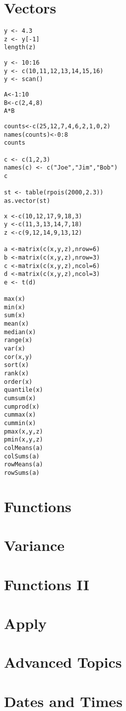 \documentclass{article}
\begin{document}


\section{Vectors}

\begin{verbatim}
y <- 4.3
z <- y[-1]
length(z)
\end{verbatim}

\begin{verbatim}
y <- 10:16
y <- c(10,11,12,13,14,15,16)
y <- scan()
\end{verbatim}

\begin{verbatim}
A<-1:10
B<-c(2,4,8)
A*B
\end{verbatim}

\begin{verbatim}
counts<-c(25,12,7,4,6,2,1,0,2)
names(counts)<-0:8
counts

c <- c(1,2,3)
names(c) <- c("Joe","Jim","Bob")
c

st <- table(rpois(2000,2.3))
as.vector(st)
\end{verbatim}

\begin{verbatim}
x <-c(10,12,17,9,18,3)
y <-c(11,3,13,14,7,18)
z <-c(9,12,14,9,13,12)

a <-matrix(c(x,y,z),nrow=6)
b <-matrix(c(x,y,z),nrow=3)
c <-matrix(c(x,y,z),ncol=6)
d <-matrix(c(x,y,z),ncol=3)
e <- t(d)

max(x)
min(x)
sum(x)
mean(x)
median(x)
range(x)
var(x)
cor(x,y)
sort(x)
rank(x)
order(x)
quantile(x)
cumsum(x)
cumprod(x)
cummax(x)
cummin(x)
pmax(x,y,z)
pmin(x,y,z)
colMeans(a)
colSums(a)
rowMeans(a)
rowSums(a)
\end{verbatim}
\section{Functions}
\section{Variance}
\section{Functions II}
\section{Apply}
\section{Advanced Topics}
\section{Dates and Times}
\end{document}
